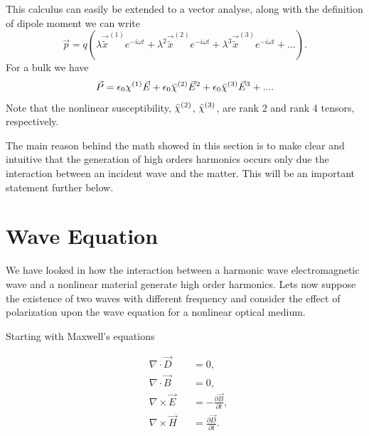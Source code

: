 This calculus can easily be extended to a vector analyse, along with the definition of dipole moment we can write
\begin{equation}
    \vec{p} = q\left(\lambda\vec{\tilde{x}}^{(1)}e^{-i\omega t}+\lambda^2\vec{\tilde{x}}^{(2)}e^{-i\omega t}+\lambda^3\vec{\tilde{x}}^{(3)}e^{-i\omega t}+... \right).
\end{equation}
For a bulk we have
\begin{equation}
    \vec{P} = \epsilon_0\chi^{(1)}\vec{E} + \epsilon_0\Bar{\chi}^{(2)}\vec{E}^2+\epsilon_0\Bar{\chi}^{(3)}\vec{E}^3+....
\label{eq:nonlim_pol}
\end{equation}
Note that the nonlinear susceptibility, $\Bar{\chi}^{(2)}$, $\Bar{\chi}^{(3)}$, are rank 2 and rank 4 tensors, respectively.

The main reason behind the math showed in this section is to make clear and intuitive that the generation of high orders harmonics occurs only due the interaction between an incident wave and the matter. This will be an important statement further below. 

\section{Wave Equation}
\label{sec:wave_equation}

We have looked in how the interaction between a harmonic wave electromagnetic wave and a nonlinear material generate high order harmonics. Lets now suppose the existence of two waves with different frequency and consider the effect of polarization upon the wave equation for a nonlinear optical medium. 

Starting with Maxwell's equations

\begin{subequations}
    \begin{alignat}{2}
        &\nabla\cdot\vec{D}  &&= 0,\\
        &\nabla\cdot\vec{B}  &&= 0,\\
        &\nabla\times\vec{E} &&= -\frac{\partial\vec{B}}{\partial t},\\ 
        &\nabla\times\vec{H} &&= \frac{\partial\vec{D}}{\partial t}.
    \end{alignat}
    \label{eq:max_eq}
\end{subequations}

